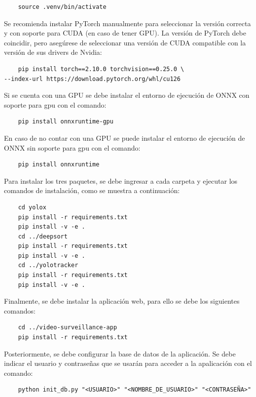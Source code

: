 \documentclass[11pt,a4paper]{article}
\begin{document}
\begin{verbatim}
    source .venv/bin/activate
\end{verbatim}

Se recomienda instalar PyTorch manualmente para seleccionar la versión correcta y con soporte para CUDA (en caso de tener GPU). La versión de PyTorch debe coincidir, pero asegúrese de seleccionar una versión de CUDA compatible con la versión de sus drivers de Nvidia:

\begin{verbatim}
    pip install torch==2.10.0 torchvision==0.25.0 \
--index-url https://download.pytorch.org/whl/cu126
\end{verbatim}

Si se cuenta con una GPU se debe instalar el entorno de ejecución de ONNX con soporte para gpu con el comando:

\begin{verbatim}
    pip install onnxruntime-gpu
\end{verbatim}

En caso de no contar con una GPU se puede instalar el entorno de ejecución de ONNX sin soporte para gpu con el comando:

\begin{verbatim}
    pip install onnxruntime
\end{verbatim}

Para instalar los tres paquetes, se debe ingresar a cada carpeta y ejecutar los comandos de instalación, como se muestra a continuación:

\begin{verbatim}
    cd yolox
    pip install -r requirements.txt
    pip install -v -e .
    cd ../deepsort
    pip install -r requirements.txt
    pip install -v -e .
    cd ../yolotracker
    pip install -r requirements.txt
    pip install -v -e .
\end{verbatim}

Finalmente, se debe instalar la aplicación web, para ello se debe los siguientes comandos:

\begin{verbatim}
    cd ../video-surveillance-app
    pip install -r requirements.txt
\end{verbatim}

Posteriormente, se debe configurar la base de datos de la aplicación. Se debe indicar el usuario y contraseñas que se usarán para acceder a la apalicación con el comando:

\begin{verbatim}
    python init_db.py "<USUARIO>" "<NOMBRE_DE_USUARIO>" "<CONTRASEÑA>"
\end{verbatim}
\end{document}
